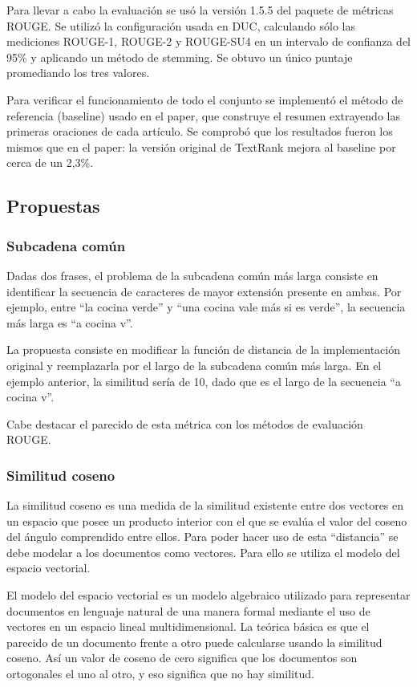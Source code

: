 \documentclass{llncs}
\begin{document}
Para llevar a cabo la evaluación se usó la versión 1.5.5 del paquete de métricas ROUGE. Se utilizó la configuración usada en DUC, calculando sólo las mediciones ROUGE-1, ROUGE-2 y ROUGE-SU4 en un intervalo de confianza del 95\% y aplicando un método de stemming. Se obtuvo un único puntaje promediando los tres valores.

Para verificar el funcionamiento de todo el conjunto se implementó el método de referencia (baseline) usado en el paper, que construye el resumen extrayendo las primeras oraciones de cada artículo. Se comprobó que los resultados fueron los mismos que en el paper: la versión original de TextRank mejora al baseline por cerca de un 2,3\%.

\subsection{Propuestas}

\subsubsection{Subcadena común}
Dadas dos frases, el problema de la subcadena común más larga consiste en identificar la secuencia de caracteres de mayor extensión presente en ambas. Por ejemplo, entre “la cocina verde” y “una cocina vale más si es verde”, la secuencia más larga es “a cocina v”.

La propuesta consiste en modificar la función de distancia de la implementación original y reemplazarla por el largo de la subcadena común más larga. En el ejemplo anterior, la similitud sería de 10, dado que es el largo de la secuencia “a cocina v”.

Cabe destacar el parecido de esta métrica con los métodos de evaluación ROUGE.


\subsubsection{Similitud coseno}
La similitud coseno es una medida de la similitud existente entre dos vectores en un espacio que posee un producto interior con el que se evalúa el valor del coseno del ángulo comprendido entre ellos. Para poder hacer uso de esta “distancia” se debe modelar a los documentos como vectores. Para ello se utiliza el modelo del espacio vectorial.

El modelo del espacio vectorial es un modelo algebraico utilizado para representar documentos en lenguaje natural de una manera formal mediante el uso de vectores en un espacio lineal multidimensional. La teórica básica es que el parecido de un documento frente a otro puede calcularse usando la similitud coseno. Así un valor de coseno de cero significa que los documentos son ortogonales el uno al otro, y eso significa que no hay similitud.
\end{document}
